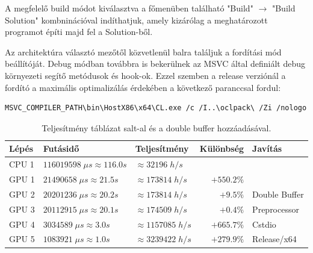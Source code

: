 A megfelelő build módot kiválasztva a főmenüben található "Build" $\xrightarrow{}$ "Build Solution" kombninációval indíthatjuk, amely kizárólag a meghatározott programot építi majd fel a Solution-ből.

Az architektúra választó mezőtől közvetlenül balra találjuk a fordítási mód beállítóját. Debug módban továbbra is bekerülnek az MSVC által definiált debug környezeti segítő metódusok és hook-ok. Ezzel szemben a release verziónál a fordító a maximális optimalizálás érdekében a következő paranccsal fordul:

\begin{lstlisting}[language={bash}]
MSVC_COMPILER_PATH\bin\HostX86\x64\CL.exe /c /I..\oclpack\ /Zi /nologo /W3 /WX- /diagnostics:column /sdl /O2 /Ob2 /Oi /Ot /GT /GL /D WIN64 /D NDEBUG /D _CONSOLE /D _UNICODE /D UNICODE /Gm- /EHsc /MD /GS /Gy /fp:precise /permissive- /Zc:wchar_t /Zc:forScope /Zc:inline /Fo".\build\obj\gpu-release\\" /Fd".\build\obj\gpu-release\vc142.pdb" /Gd /TP /FC /errorReport:prompt crackSingle.cpp crackSingleSalted.cpp GPUController.cpp hashMultiple.cpp platformDetails.cpp hashSingle.cpp hashSingleSalted.cpp main.cpp
\end{lstlisting}


\begin{table}[H]
    \centering
    \begin{tabular}{l|l|l|r|l}
        \textbf{Lépés} & \textbf{Futásidő} & \textbf{Teljesítmény} & \textbf{Különbség} & \textbf{Javítás} \\
        \hline
        \hline
        
        CPU 1 & $\num{116 019 598} \; \mu s \approx \num{116.0}s $ & $\approx \num{32 196} \; h/s$ & & \\
        \hline
                            
        GPU 1 & $\num{21 490 658} \; \mu s \approx \num{21.5}s $ & $\approx \num{173 814} \; h/s$ & $+550.2\%$ & \\
        \hline
        
        GPU 2 & $\num{20 201 236} \; \mu s \approx \num{20.2}s $ & $\approx \num{173 814} \; h/s$ & $+9.5\%$ & Double Buffer \\
        \hline
        
        GPU 3 & $\num{20 112 915} \; \mu s \approx \num{20.1}s $ & $\approx \num{174 509} \; h/s$ & $+0.4\%$ & Preprocessor \\
        \hline
        
        GPU 4 & $\num{3 034 589} \; \mu s \approx \num{3.0}s $ & $\approx \num{1 157 085} \; h/s$ & $+665.7\%$ & Cstdio \\
        \hline
        
        GPU 5 & $\num{1 083 921} \; \mu s \approx \num{1.0}s $ & $\approx \num{3 239 422} \; h/s$ & $+279.9\%$ & Release/x64 \\
        \hline
    \end{tabular}
    \caption{Teljesítmény táblázat salt-al és a double buffer hozzáadásával.}
\end{table}




